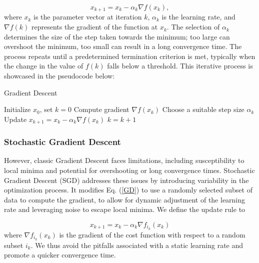 \documentclass[a4paper]{report}
\begin{document}
\begin{equation}\label{GD}
    x_{k+1} = x_k - \alpha_k \nabla f(x_k),
\end{equation}
where $x_k$ is the parameter vector at iteration $k$, $\alpha_k$ is the learning rate, and $\nabla f(k)$ represents the gradient of the function at $x_k$. The selection of $\alpha_k$ determines the size of the step taken towards the minimum; too large can overshoot the minimum, too small can result in a long convergence time. The process repeats until a predetermined termination criterion is met, typically when the change in the value of $f(k)$ falls below a threshold. This iterative process is showcased in the pseudocode below:

\begin{algorithm}
\caption{Gradient Descent}
\begin{algorithmic}[1]
\State Initialize \( x_0 \), set \( k = 0 \)
    \State Compute gradient \( \nabla f(x_k) \)
    \State Choose a suitable step size \( \alpha_k \)
    \State Update \( x_{k+1} = x_k - \alpha_k \nabla f(x_k) \)
    \State \( k = k + 1 \)
\EndWhile
\end{algorithmic}
\end{algorithm}

\subsubsection{Stochastic Gradient Descent}

However, classic Gradient Descent faces limitations, including susceptibility to local minima and potential for overshooting or long convergence times. Stochastic Gradient Descent (SGD) addresses these issues by introducing variability in the optimization process. It modifies Eq. (\ref{GD}) to use a randomly selected subset of data to compute the gradient, to allow for dynamic adjustment of the learning rate and leveraging noise to escape local minima. We define the update rule to 

\begin{equation}\label{SGD}
x_{k+1} = x_k - \alpha_k \nabla f_{i_k}(x_k)	
\end{equation}
where $\nabla f_{i_k}(x_k)$ is the gradient of the cost function with respect to a random subset $i_k$. We thus avoid the pitfalls associated with a static learning rate and promote a quicker convergence time.
\end{document}
